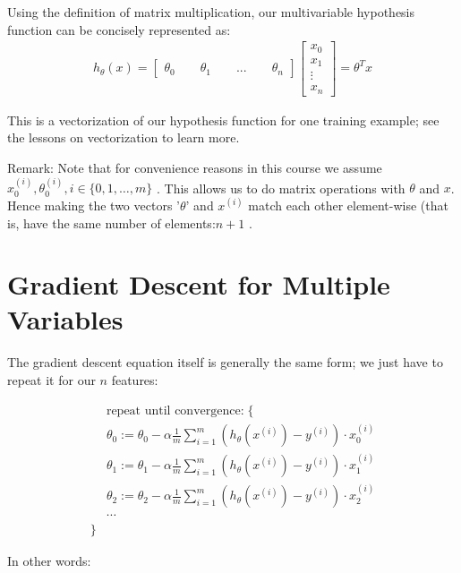 \documentclass[10pt,a4paper,UTF8]{article}
\begin{document}
Using the definition of matrix multiplication, our multivariable hypothesis function can be concisely represented as:
\begin{align*}h_\theta(x) =\begin{bmatrix}\theta_0 \hspace{2em} \theta_1 \hspace{2em} ... \hspace{2em} \theta_n\end{bmatrix}\begin{bmatrix}x_0 \\ x_1 \\ \vdots \\ x_n\end{bmatrix}= \theta^T x\end{align*}

This is a vectorization of our hypothesis function for one training example; see the lessons on vectorization to learn more.

Remark: Note that for convenience reasons in this course we assume \(x_{0}^{(i)},\theta_{0}^{(i)},i\in \{0,1,\ldots ,m\}\) . This allows us to do matrix operations with \(\theta\) and \(x\). Hence making the two vectors '\(\theta\)' and \(x^{(i)}\) match each other element-wise (that is, have the same number of elements:\(n+1\) .

\section{Gradient Descent for Multiple Variables}
\label{sec:orgb53527c}

The gradient descent equation itself is generally the same form; we just have to repeat it for our \(n\) features:

\begin{align*} & \text{repeat until convergence:} \; \lbrace \\ \; & \theta_0 := \theta_0 - \alpha \frac{1}{m} \sum\limits_{i=1}^{m} (h_\theta(x^{(i)}) - y^{(i)}) \cdot x_0^{(i)}\\ \; & \theta_1 := \theta_1 - \alpha \frac{1}{m} \sum\limits_{i=1}^{m} (h_\theta(x^{(i)}) - y^{(i)}) \cdot x_1^{(i)} \\ \; & \theta_2 := \theta_2 - \alpha \frac{1}{m} \sum\limits_{i=1}^{m} (h_\theta(x^{(i)}) - y^{(i)}) \cdot x_2^{(i)} \\ & \cdots \\ \rbrace \end{align*}

In other words:
\end{document}

